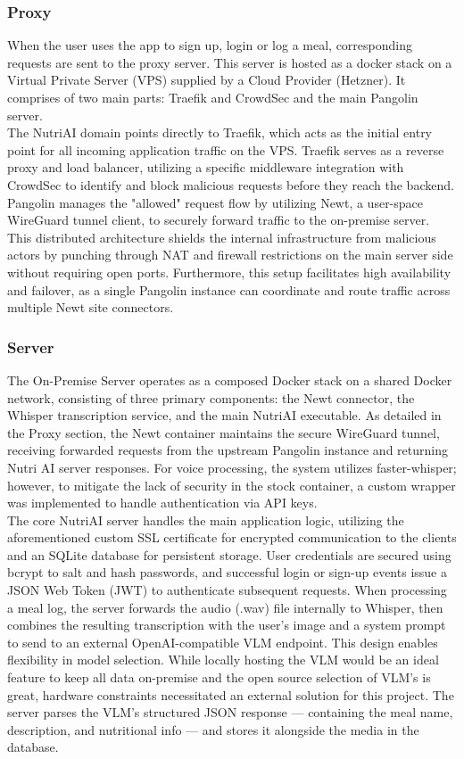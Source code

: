\documentclass[11pt,a4paper]{article}
\begin{document}
\subsubsection{Proxy}
When the user uses the app to sign up, login or log a meal, corresponding requests are sent to the proxy server.
 This server is hosted as a docker stack on a Virtual Private Server (VPS) supplied by a Cloud Provider (Hetzner). It comprises of two main parts: Traefik and CrowdSec and the main Pangolin server. \\
 The NutriAI domain points directly to Traefik, which acts as the initial entry point for all incoming application traffic on the VPS. Traefik serves as a reverse proxy and load balancer, utilizing a specific middleware integration with CrowdSec to identify and block malicious requests before they reach the backend.
 Pangolin manages the "allowed" request flow by utilizing Newt, a user-space WireGuard tunnel client, to securely forward traffic to the on-premise server. This distributed architecture shields the internal infrastructure from malicious actors by punching through NAT and firewall restrictions on the main server side without requiring open ports. Furthermore, this setup facilitates high availability and failover, as a single Pangolin instance can coordinate and route traffic across multiple Newt site connectors.


\subsubsection{Server}
The On-Premise Server operates as a composed Docker stack on a shared Docker network, consisting of three primary components: the Newt connector, the Whisper transcription service, and the main NutriAI executable. As detailed in the Proxy section, the Newt container maintains the secure WireGuard tunnel, receiving forwarded requests from the upstream Pangolin instance and returning Nutri AI server responses. For voice processing, the system utilizes faster-whisper; however, to mitigate the lack of security in the stock container, a custom wrapper was implemented to handle authentication via API keys.
\\
The core NutriAI server handles the main application logic, utilizing the aforementioned custom SSL certificate for encrypted communication to the clients and an SQLite database for persistent storage. User credentials are secured using bcrypt to salt and hash passwords, and successful login or sign-up events issue a JSON Web Token (JWT) to authenticate subsequent requests. When processing a meal log, the server forwards the audio (.wav) file internally to Whisper, then combines the resulting transcription with the user’s image and a system prompt to send to an external OpenAI-compatible VLM endpoint. This design enables flexibility in model selection. While locally hosting the VLM would be an ideal feature to keep all data on-premise and the open source selection of VLM's is great, hardware constraints necessitated an external solution for this project. The server parses the VLM's structured JSON response — containing the meal name, description, and nutritional info — and stores it alongside the media in the database. %
\end{document}
